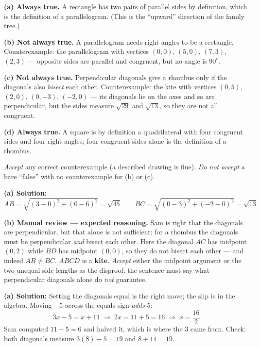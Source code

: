\documentclass[12pt]{article}
\begin{document}
\textbf{(a) Always true.} A rectangle has two pairs of parallel sides by definition, which is the
definition of a parallelogram. (This is the ``upward'' direction of the family tree.)

\textbf{(b) Not always true.} A parallelogram needs right angles to be a rectangle. Counterexample:
the parallelogram with vertices $(0,0)$, $(5,0)$, $(7,3)$, $(2,3)$ --- opposite sides are parallel
and congruent, but no angle is $90^\circ$.

\textbf{(c) Not always true.} Perpendicular diagonals give a rhombus only if the diagonals also
\emph{bisect} each other. Counterexample: the kite with vertices $(0,5)$, $(2,0)$, $(0,-3)$,
$(-2,0)$ --- its diagonals lie on the axes and so are perpendicular, but the sides measure
$\sqrt{29}$ and $\sqrt{13}$, so they are not all congruent.

\textbf{(d) Always true.} A square is by definition a quadrilateral with four congruent sides and
four right angles; four congruent sides alone is the definition of a rhombus.

\emph{Accept} any correct counterexample (a described drawing is fine). \emph{Do not accept} a bare
``false'' with no counterexample for (b) or (c).

\textbf{(a) Solution:}
\[ AB = \sqrt{(3-0)^2 + (0-6)^2} = \sqrt{45} \qquad
   BC = \sqrt{(0-3)^2 + (-2-0)^2} = \sqrt{13} \]
 \qquad {}

\textbf{(b) Manual review --- expected reasoning.} Sam is right that the diagonals are
perpendicular, but that alone is not sufficient: for a rhombus the diagonals must be perpendicular
\emph{and} bisect each other. Here the diagonal $AC$ has midpoint $(0,2)$ while $BD$ has midpoint
$(0,0)$, so they do not bisect each other --- and indeed $AB \neq BC$. $ABCD$ is a
\textbf{kite}. \emph{Accept} either the midpoint argument or the two unequal side lengths as the
disproof; the sentence must say what perpendicular diagonals alone do \emph{not} guarantee.

\textbf{(a) Solution:} Setting the diagonals equal is the right move; the slip is in the algebra.
Moving $-5$ across the equals sign \emph{adds} $5$:
\[ 3x - 5 = x + 11 \;\Rightarrow\; 2x = 11 + 5 = 16 \;\Rightarrow\; x = \frac{16}{2} \]
Sam computed $11 - 5 = 6$ and halved it, which is where the $3$ came from. Check: both diagonals
measure $3(8) - 5 = 19$ and $8 + 11 = 19$.
\end{document}

